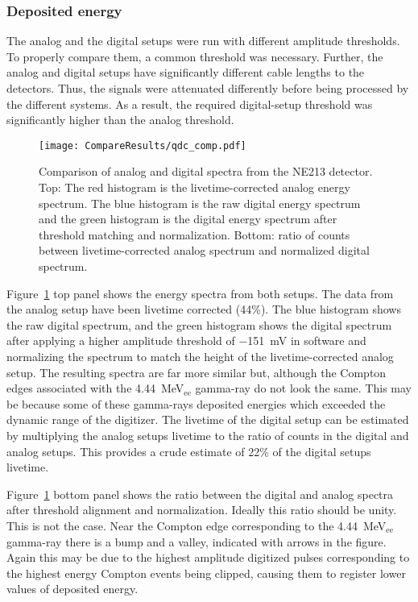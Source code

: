 \documentclass[main.tex]{subfiles}
\begin{document}
\subsubsection{Deposited energy}
The analog and the digital setups were run with different amplitude thresholds. To properly compare them, a common threshold was necessary. Further, the analog and digital setups have significantly different cable lengths to the detectors. Thus, the signals were attenuated differently before being processed by the different systems. As a result, the required digital-setup threshold was significantly higher than the analog threshold.

\begin{figure}[h!]
    \centering
        \texttt{[image: CompareResults/qdc\_comp.pdf]}
        \caption[Comparison of analog and digital spectra from the NE213 detector]{Comparison of analog and digital spectra from the NE213 detector. Top: The red histogram is the livetime-corrected analog energy spectrum. The blue histogram is the raw digital energy spectrum and the green histogram is the digital energy spectrum after threshold matching and normalization. Bottom: ratio of counts between livetime-corrected analog spectrum and normalized digital spectrum.}
    \label{fig:qdc_comp}
\end{figure}
Figure~\ref{fig:qdc_comp} top panel shows the energy spectra from both setups. The data from the analog setup have been livetime corrected (44\%). The blue histogram shows the raw digital spectrum, and the green histogram shows the digital spectrum after applying a higher amplitude threshold of \SI{-151}{mV} in software and normalizing the spectrum to match the height of the livetime-corrected analog setup. The resulting spectra are far more similar but, although the Compton edges associated with the \SI{4.44}{\MeV}$_\text{ee}$ gamma-ray do not look the same. This may be because some of these gamma-rays deposited energies which exceeded the dynamic range of the digitizer. 
The livetime of the digital setup can be estimated by multiplying the analog setups livetime to the ratio of counts in the digital and analog setups. This provides a crude estimate of 22\% of the digital setups livetime.

Figure~\ref{fig:qdc_comp} bottom panel shows the ratio between the digital and analog spectra after threshold alignment and normalization. Ideally this ratio should be unity. This is not the case. Near the Compton edge corresponding to the \SI{4.44}{\MeV}$_\text{ee}$ gamma-ray there is a bump and a valley, indicated with arrows in the figure. Again this may be due to the highest amplitude digitized pulses corresponding to the highest energy Compton events being clipped, causing them to register lower values of deposited energy.
\end{document}
